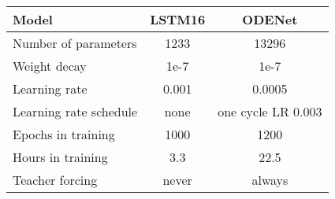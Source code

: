 \begin{tabular}{@{}l|c c @{}}
\toprule
Model & LSTM16 & ODENet \\ \midrule %
Number of   parameters & 1233 & 13296 \\
Weight decay & 1e-7 & 1e-7             \\
Learning rate & 0.001 & 0.0005            \\
Learning rate schedule & none & one cycle LR 0.003      \\
Epochs in training & 1000 & 1200            \\
Hours in training & 3.3 & 22.5           \\
Teacher forcing & never & always       \\ \bottomrule
\end{tabular}%
